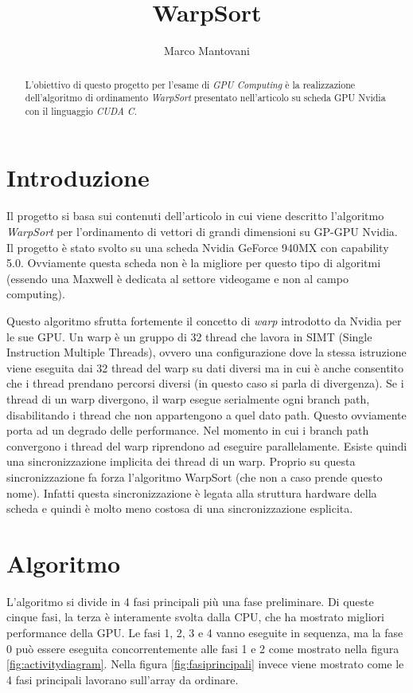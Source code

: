 \documentclass[a4paper, 11pt]{article}
\author{Marco Mantovani}
\title{WarpSort}
\begin{document}
	\maketitle
	\begin{abstract}
		L'obiettivo di questo progetto per l'esame di \emph{GPU Computing} è la realizzazione dell'algoritmo di ordinamento \emph{WarpSort}
		presentato nell'articolo \cite{main} su scheda GPU Nvidia con il linguaggio \emph{CUDA C}.
	\end{abstract}
	\section{Introduzione}
		Il progetto si basa sui contenuti dell'articolo \cite{main} in cui viene descritto 
		l'algoritmo \emph{WarpSort} per l'ordinamento di vettori
		di grandi dimensioni su GP-GPU Nvidia.
		Il progetto è stato svolto su una scheda Nvidia GeForce 940MX \cite{GeForce}
		con capability 5.0. Ovviamente questa scheda non
		è la migliore per questo tipo di algoritmi (essendo una Maxwell è dedicata al settore videogame e non al campo computing). 
		
		Questo algoritmo sfrutta fortemente il concetto di \emph{warp} introdotto da Nvidia per le sue GPU.
		Un warp è un gruppo di 32 thread che lavora in SIMT (Single Instruction Multiple Threads), ovvero una configurazione
		dove la stessa istruzione viene eseguita dai 32 thread del warp su dati diversi ma in cui è anche consentito che i thread prendano
		percorsi diversi (in questo caso si parla di divergenza). 
		Se i thread di un warp divergono, il warp esegue serialmente ogni branch path,  disabilitando i thread che non appartengono a quel dato 
		path. Questo ovviamente porta ad un degrado delle performance. Nel momento in cui i branch path convergono i thread del warp 
		riprendono ad eseguire parallelamente. Esiste quindi una sincronizzazione implicita dei thread di un warp. Proprio su questa 
		sincronizzazione fa forza l'algoritmo WarpSort (che non a caso prende questo nome).
		Infatti questa sincronizzazione è legata alla struttura hardware della scheda e quindi è molto meno costosa di una sincronizzazione 
		esplicita.
	
	\section{Algoritmo}
		L'algoritmo si divide in 4 fasi principali più una fase preliminare. 
		Di queste cinque fasi, la terza è interamente svolta dalla CPU, che ha mostrato migliori performance della GPU.
		Le fasi 1, 2, 3 e 4 vanno eseguite in sequenza, ma la fase 0 può essere eseguita concorrentemente alle fasi 1 e 2 come mostrato
		nella figura \ref{fig:activitydiagram}.
		Nella figura \ref{fig:fasiprincipali} invece viene mostrato come le 4 fasi principali lavorano sull'array da ordinare.
		
\end{document}

